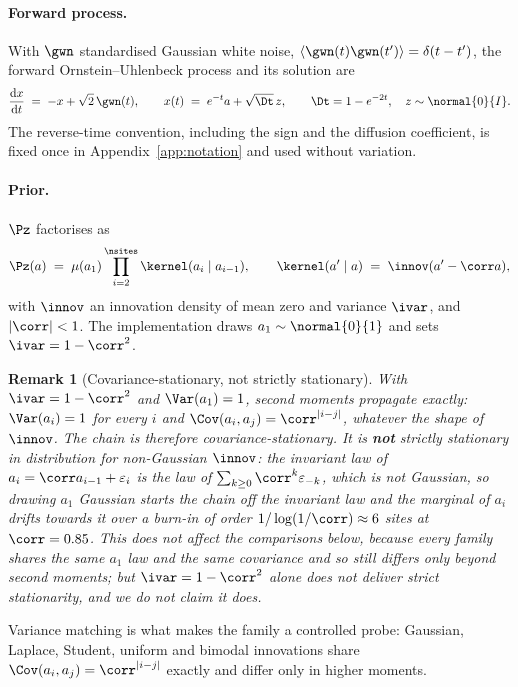 \documentclass{article}
\newtheorem{remark}{Remark}
\begin{document}
\paragraph{Forward process.} With $\gwn$ standardised Gaussian white noise,
$\langle\gwn(t)\gwn(t')\rangle=\delta(t-t')$, the forward Ornstein--Uhlenbeck process and its
solution are
\begin{equation}
\label{eq:forward}
\frac{\mathrm{d}x}{\mathrm{d}t} \;=\; -x + \sqrt{2}\,\gwn(t),
\qquad
x(t) \;=\; e^{-t} a + \sqrt{\Dt}\, z,
\qquad
\Dt = 1 - e^{-2t},
\quad z\sim\normal{0}{I}.
\end{equation}
The reverse-time convention, including the sign and the diffusion coefficient, is fixed once in
Appendix~\ref{app:notation} and used without variation.

\paragraph{Prior.} $\Pz$ factorises as
\begin{equation}
\label{eq:prior}
\Pz(a) \;=\; \mu(a_1)\prod_{i=2}^{\nsites} \kernel(a_i \mid a_{i-1}),
\qquad
\kernel(a'\mid a) \;=\; \innov(a' - \corr a),
\end{equation}
with $\innov$ an innovation density of mean zero and variance $\ivar$, and $|\corr|<1$. The
implementation draws $a_1\sim\normal{0}{1}$ and sets $\ivar = 1-\corr^2$.

\begin{remark}[Covariance-stationary, not strictly stationary]
\label{rem:stationary}
With $\ivar = 1-\corr^2$ and $\Var(a_1)=1$, second moments propagate exactly: $\Var(a_i)=1$ for
every $i$ and $\Cov(a_i,a_j)=\corr^{|i-j|}$, whatever the shape of $\innov$. The chain is
therefore \emph{covariance-stationary}. It is \textbf{not} strictly stationary in distribution
for non-Gaussian $\innov$: the invariant law of $a_i=\corr a_{i-1}+\varepsilon_i$ is the law of
$\sum_{k\ge0}\corr^k\varepsilon_{-k}$, which is not Gaussian, so drawing $a_1$ Gaussian starts
the chain off the invariant law and the marginal of $a_i$ drifts towards it over a burn-in of
order $1/\log(1/\corr)\approx 6$ sites at $\corr=0.85$. This does not affect the comparisons
below, because every family shares the same $a_1$ law and the same covariance and so still
differs only beyond second moments; but $\ivar=1-\corr^2$ alone does not deliver strict
stationarity, and we do not claim it does.
\end{remark}

Variance matching is what makes the family a controlled probe: Gaussian, Laplace, Student,
uniform and bimodal innovations share $\Cov(a_i,a_j)=\corr^{|i-j|}$ exactly and differ only in
higher moments.
\end{document}
